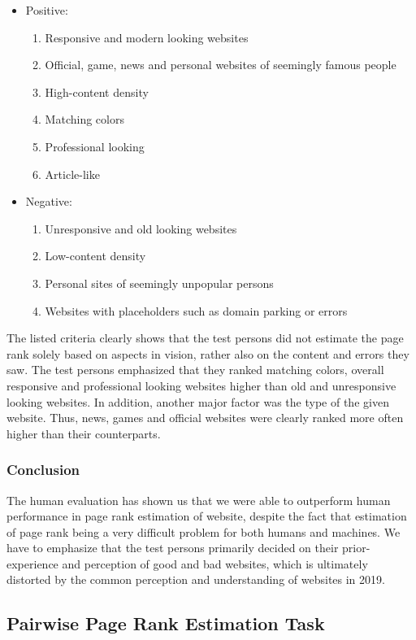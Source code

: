 \begin{itemize}
	\item Positive: \begin{enumerate}
	 \item Responsive and modern looking websites
	 \item Official, game, news and personal websites of seemingly famous people
	 \item High-content density
	 \item Matching colors
	 \item Professional looking
	 \item Article-like
	\end{enumerate}
	\item Negative: \begin{enumerate}
	\item Unresponsive and old looking websites
	\item Low-content density
	\item Personal sites of seemingly unpopular persons
	\item Websites with placeholders such as domain parking or errors
	\end{enumerate}
\end{itemize}

The listed criteria clearly shows that the test persons did not estimate the page rank solely based on aspects in vision, rather also on the content and errors they saw. The test persons emphasized that they ranked matching colors, overall responsive and professional looking websites higher than old and unresponsive looking websites. In addition, another major factor was the type of the given website. Thus, news, games and official websites were clearly ranked more often higher than their counterparts.

\subsubsection{Conclusion}
The human evaluation has shown us that we were able to outperform human performance in page rank estimation of website, despite the fact that estimation of page rank being a very difficult problem for both humans and machines. We have to emphasize that the test persons primarily decided on their prior-experience and perception of good and bad websites, which is ultimately distorted by the common perception and understanding of websites in 2019.
\subsection{Pairwise Page Rank Estimation Task}

